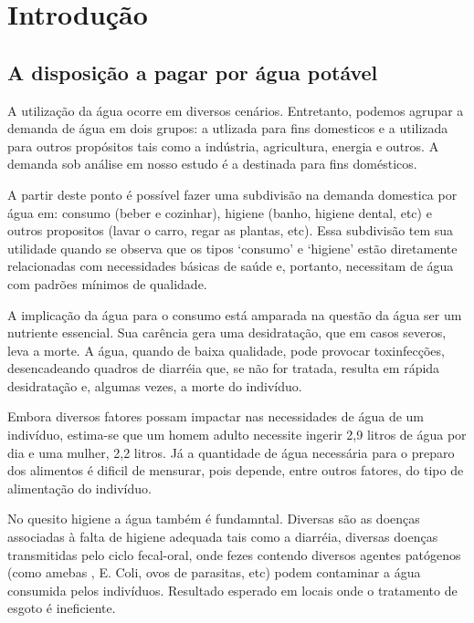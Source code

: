 \documentclass[
  12pt,
]{book}
\begin{document}
{
\setcounter{tocdepth}{2}
\tableofcontents
}
\listoftables
\listoffigures
{}
\hypertarget{introduuxe7uxe3o}{%
\chapter{Introdução}\label{introduuxe7uxe3o}}

\hypertarget{a-disposiuxe7uxe3o-a-pagar-por-uxe1gua-potuxe1vel}{%
\section{A disposição a pagar por água potável}\label{a-disposiuxe7uxe3o-a-pagar-por-uxe1gua-potuxe1vel}}

A utilização da água ocorre em diversos cenários. Entretanto, podemos agrupar a demanda de água em dois grupos: a utlizada para fins domesticos e a utilizada para outros propósitos tais como a indústria, agricultura, energia e outros. A demanda sob análise em nosso estudo é a destinada para fins domésticos.

A partir deste ponto é possível fazer uma subdivisão na demanda domestica por água em: consumo (beber e cozinhar), higiene (banho, higiene dental, etc) e outros propositos (lavar o carro, regar as plantas, etc). Essa subdivisão tem sua utilidade quando se observa que os tipos `consumo' e `higiene' estão diretamente relacionadas com necessidades básicas de saúde e, portanto, necessitam de água com padrões mínimos de qualidade.

A implicação da água para o consumo está amparada na questão da água ser um nutriente essencial. Sua carência gera uma desidratação, que em casos severos, leva a morte. A água, quando de baixa qualidade, pode provocar toxinfecções, desencadeando quadros de diarréia que, se não for tratada, resulta em rápida desidratação e, algumas vezes, a morte do indivíduo.

Embora diversos fatores possam impactar nas necessidades de água de um indivíduo, estima-se que um homem adulto necessite ingerir 2,9 litros de água por dia e uma mulher, 2,2 litros. Já a quantidade de água necessária para o preparo dos alimentos é dificil de mensurar, pois depende, entre outros fatores, do tipo de alimentação do indivíduo.

No quesito higiene a água também é fundamntal. Diversas são as doenças associadas à falta de higiene adequada tais como a diarréia, diversas doenças transmitidas pelo ciclo fecal-oral, onde fezes contendo diversos agentes patógenos (como amebas , E. Coli, ovos de parasitas, etc) podem contaminar a água consumida pelos indivíduos. Resultado esperado em locais onde o tratamento de esgoto é ineficiente.
\end{document}
